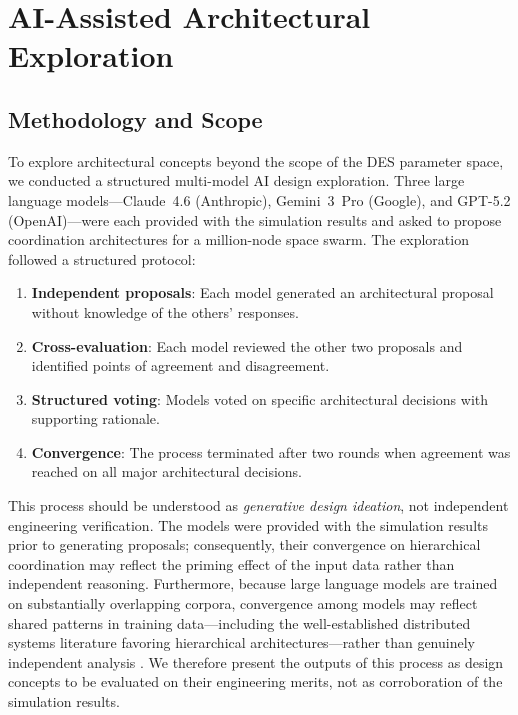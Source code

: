 \documentclass[journal]{IEEEtran}
\begin{document}
\section{AI-Assisted Architectural Exploration}

\subsection{Methodology and Scope}

To explore architectural concepts beyond the scope of the DES parameter space, we conducted a structured multi-model AI design exploration. Three large language models---Claude~4.6 (Anthropic), Gemini~3~Pro (Google), and GPT-5.2 (OpenAI)---were each provided with the simulation results and asked to propose coordination architectures for a million-node space swarm. The exploration followed a structured protocol:

\begin{enumerate}
    \item \textbf{Independent proposals}: Each model generated an architectural proposal without knowledge of the others' responses.
    \item \textbf{Cross-evaluation}: Each model reviewed the other two proposals and identified points of agreement and disagreement.
    \item \textbf{Structured voting}: Models voted on specific architectural decisions with supporting rationale.
    \item \textbf{Convergence}: The process terminated after two rounds when agreement was reached on all major architectural decisions.
\end{enumerate}

This process should be understood as \emph{generative design ideation}, not independent engineering verification. The models were provided with the simulation results prior to generating proposals; consequently, their convergence on hierarchical coordination may reflect the priming effect of the input data rather than independent reasoning. Furthermore, because large language models are trained on substantially overlapping corpora, convergence among models may reflect shared patterns in training data---including the well-established distributed systems literature favoring hierarchical architectures---rather than genuinely independent analysis \cite{surowiecki_2004}. We therefore present the outputs of this process as design concepts to be evaluated on their engineering merits, not as corroboration of the simulation results.
\end{document}

